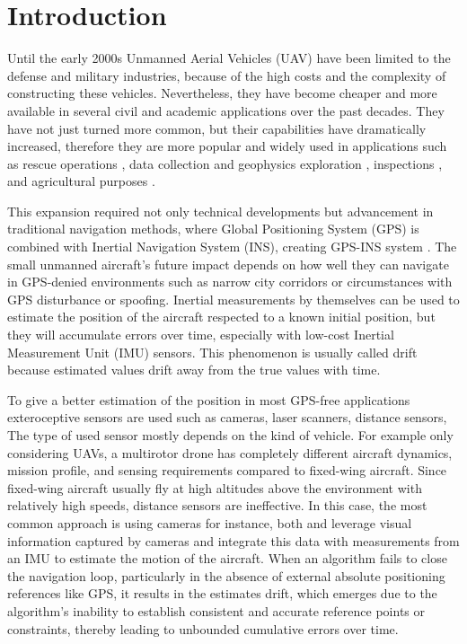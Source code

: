 \chapter{Introduction}

Until the early 2000s Unmanned Aerial Vehicles (UAV) have been limited to the defense and military industries, because of the high costs and the complexity of constructing these vehicles. Nevertheless, they have become cheaper and more available in several civil and academic applications over the past decades. They have not just turned more common, but their capabilities have dramatically increased, therefore they are more popular and widely used in applications such as rescue operations \cite{rescue-operations}, data collection and geophysics exploration \cite{data-collection}, inspections \cite{inspection}, and agricultural purposes \cite{agriculure}.

This expansion required not only technical developments but advancement in traditional navigation methods, where Global Positioning System (GPS) is combined with Inertial Navigation System (INS), creating GPS-INS system \cite{gps-ins}. The small unmanned aircraft's future impact depends on how well they can navigate in GPS-denied environments such as narrow city corridors or circumstances with GPS disturbance or spoofing.  Inertial measurements by themselves can be used to estimate the position of the aircraft respected to a known initial position, but they will accumulate errors over time, especially with low-cost Inertial Measurement Unit (IMU) sensors. This phenomenon is usually called drift because estimated values drift away from the true values with time.

To give a better estimation of the position in most GPS-free applications exteroceptive sensors are used such as cameras, laser scanners, distance sensors, \etc The type of used sensor mostly depends on the kind of vehicle. For example only considering UAVs, a multirotor drone has completely different aircraft dynamics, mission profile, and sensing requirements compared to fixed-wing aircraft. Since fixed-wing aircraft usually fly at high altitudes above the environment with relatively high speeds, distance sensors are ineffective. In this case, the most common approach is using cameras for instance, both \cite{gps-ins-cam} and \cite{rel-nav} leverage visual information captured by cameras and integrate this data with measurements from an IMU to estimate the motion of the aircraft. When an algorithm fails to close the navigation loop, particularly in the absence of external absolute positioning references like GPS, it results in the estimates drift, which emerges due to the algorithm's inability to establish consistent and accurate reference points or constraints, thereby leading to unbounded cumulative errors over time.


